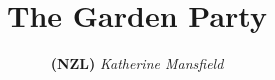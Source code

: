 \documentclass{report}
\begin{document}
\title{The Garden Party}
\author{\textbf{(NZL)} \textit{Katherine Mansfield}}
\date{}
\maketitle
\pagestyle{plain}

\end{document}
